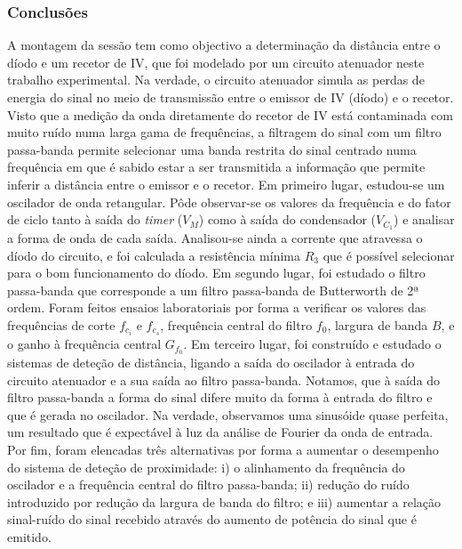 \subsubsection{Conclusões}
A montagem da sessão tem como objectivo a determinação da distância entre o díodo e um recetor de IV, que foi modelado por um circuito atenuador neste trabalho experimental. Na verdade, o circuito atenuador simula as perdas de energia do sinal no meio de transmissão entre o emissor de IV (díodo) e o recetor. Visto que a medição da onda diretamente do recetor de IV está contaminada com muito ruído numa larga gama de frequências, a filtragem do sinal com um filtro passa-banda permite selecionar uma banda restrita do sinal centrado numa frequência em que é sabido estar a ser transmitida a informação que permite inferir a distância entre o emissor e o recetor. Em primeiro lugar, estudou-se um oscilador de onda retangular. Pôde observar-se os valores da frequência e do fator de ciclo tanto à saída do \textit{timer} ($V_M$) como à saída do condensador ($V_{C_1}$) e analisar a forma de onda de cada saída. Analisou-se ainda a corrente que atravessa o díodo do circuito, e foi calculada a resistência mínima $R_3$ que é possível selecionar para o bom funcionamento do díodo. Em segundo lugar, foi estudado o filtro passa-banda que corresponde a um filtro passa-banda de Butterworth de 2ª ordem. Foram feitos ensaios laboratoriais por forma a verificar os valores das frequências de corte $f_{c_i}$ e $f_{c_s}$, frequência central do filtro $f_0$, largura de banda $B$, e o ganho à frequência central $G_{f_0}$. Em terceiro lugar, foi construído e estudado o sistemas de deteção de distância, ligando a saída do oscilador à entrada do circuito atenuador e a sua saída ao filtro passa-banda. Notamos, que à saída do filtro passa-banda a forma do sinal difere muito da forma à entrada do filtro e que é gerada no oscilador. Na verdade, observamos uma sinusóide quase perfeita, um resultado que é expectável à luz da análise de Fourier da onda de entrada. Por fim, foram elencadas três alternativas por forma a aumentar o desempenho do sistema de deteção de proximidade: i) o alinhamento da frequência do oscilador e a frequência central do filtro passa-banda; ii) redução do ruído introduzido por redução da largura de banda do filtro; e iii) aumentar a relação sinal-ruído do sinal recebido através do aumento de potência do sinal que é emitido.